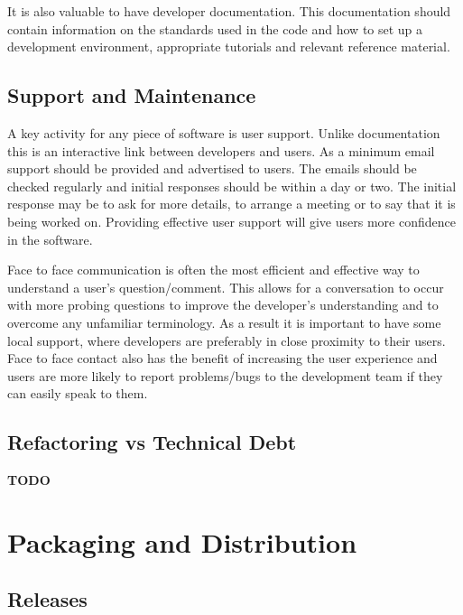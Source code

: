 \documentclass[jnr]{iosart2x}
\newcommand{\todo}[1]{\textbf{#1}}
\begin{document}
It is also valuable to have developer documentation.
This documentation should contain information on the standards used in the code and how to set up a development environment, appropriate tutorials and relevant reference material.

\subsection{Support and Maintenance}
\label{Support and Maintenance}

A key activity for any piece of software is user support.
Unlike documentation this is an interactive link between developers and users.
As a minimum email support should be provided and advertised to users.
The emails should be checked regularly and initial responses should be within a day or two.
The initial response may be to ask for more details, to arrange a meeting or to say that it is being worked on.
Providing effective user support will give users more confidence in the software.

Face to face communication is often the most efficient and effective way to understand a user's question/comment.
This allows for a conversation to occur with more probing questions to improve the developer's understanding and to overcome any unfamiliar terminology.
As a result it is important to have some local support, where developers are preferably in close proximity to their users.
Face to face contact also has the benefit of increasing the user experience and users are more likely to report problems/bugs to the development team if they can easily speak to them.

\subsection{Refactoring vs Technical Debt}
\label{Refactoring}

\todo{TODO}

\section{Packaging and Distribution}
\label{Packaging and Distribution}

\subsection{Releases}
\label{Releases}
\end{document}
